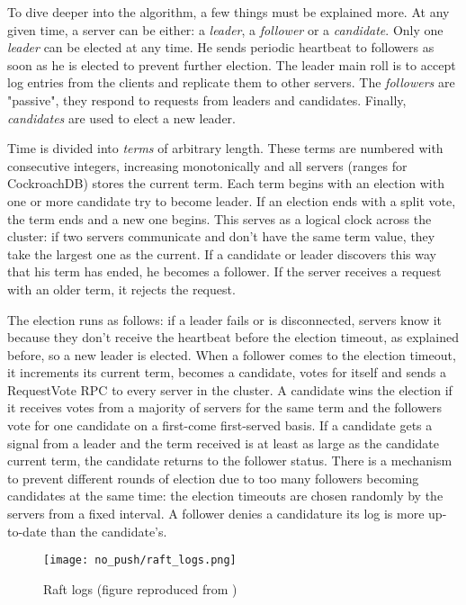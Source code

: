 To dive deeper into the algorithm, a few things must be explained more. At any given time, a server can be either: a \emph{leader}, a \emph{follower} or a \emph{candidate}. Only one \emph{leader} can be elected at any time. He sends periodic heartbeat to followers as soon as he is elected to prevent further election. The leader main roll is to accept log entries from the clients and replicate them to other servers. The \emph{followers} are "passive", they respond to requests from leaders and candidates. Finally, \emph{candidates} are used to elect a new leader.

Time is divided into \emph{terms} of arbitrary length. These terms are numbered with consecutive integers, increasing monotonically and all servers (ranges for CockroachDB) stores the current term. Each term begins with an election with one or more candidate try to become leader. If an election ends with a split vote, the term ends and a new one begins. This serves as a logical clock across the cluster: if two servers communicate and don't have the same term value, they take the largest one as the current. If a candidate or leader discovers this way that his term has ended, he becomes a follower. If the server receives a request with an older term, it rejects the request.

The election runs as follows: if a leader fails or is disconnected, servers know it because they don't receive the heartbeat before the election timeout, as explained before, so a new leader is elected. When a follower comes to the election timeout, it increments its current term, becomes a candidate, votes for itself and sends a RequestVote RPC to every server in the cluster. A candidate wins the election if it receives votes from a majority of servers for the same term and the followers vote for one candidate on a first-come first-served basis. If a candidate gets a signal from a leader and the term received is at least as large as the candidate current term, the candidate returns to the follower status. There is a mechanism to prevent different rounds of election due to too many followers becoming candidates at the same time: the election timeouts are chosen randomly by the servers from a fixed interval. A follower denies a candidature its log is more up-to-date than the candidate's.

\begin{figure}[H]
  \vspace{-10pt}
  \centering
  \centerline{\texttt{[image: no\_push/raft\_logs.png]}}
  \vspace{-5pt}
  \caption{Raft logs (figure reproduced from \cite{DBLP:conf/usenix/OngaroO14})}
  \vspace{-5pt}
  \label{fig:raft-log}
\end{figure}


